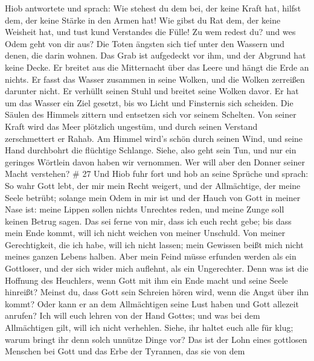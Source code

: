 Hiob antwortete und sprach:  Wie stehest du dem bei, der
keine Kraft hat, hilfst dem, der keine Stärke in den Armen hat!
 Wie gibst du Rat dem, der keine Weisheit hat, und tust kund
Verstandes die Fülle!  Zu wem redest du? und wes Odem geht
von dir aus?  Die Toten ängsten sich tief unter den Wassern
und denen, die darin wohnen.  Das Grab ist aufgedeckt vor
ihm, und der Abgrund hat keine Decke.  Er breitet aus die
Mitternacht über das Leere und hängt die Erde an nichts.  Er
fasst das Wasser zusammen in seine Wolken, und die Wolken zerreißen
darunter nicht.  Er verhüllt seinen Stuhl und breitet seine
Wolken davor.  Er hat um das Wasser ein Ziel gesetzt, bis
wo Licht und Finsternis sich scheiden.  Die Säulen des
Himmels zittern und entsetzen sich vor seinem Schelten. 
Von seiner Kraft wird das Meer plötzlich ungestüm, und durch seinen
Verstand zerschmettert er Rahab.  Am Himmel wird's schön
durch seinen Wind, und seine Hand durchbohrt die flüchtige Schlange.
 Siehe, also geht sein Tun, und nur ein geringes Wörtlein
davon haben wir vernommen. Wer will aber den Donner seiner Macht
verstehen? \# 27  Und Hiob fuhr fort und hob an seine
Sprüche und sprach:  So wahr Gott lebt, der mir mein Recht
weigert, und der Allmächtige, der meine Seele betrübt; 
solange mein Odem in mir ist und der Hauch von Gott in meiner Nase ist:
 meine Lippen sollen nichts Unrechtes reden, und meine Zunge
soll keinen Betrug sagen.  Das sei ferne von mir, dass ich
euch recht gebe; bis dass mein Ende kommt, will ich nicht weichen von
meiner Unschuld.  Von meiner Gerechtigkeit, die ich habe,
will ich nicht lassen; mein Gewissen beißt mich nicht meines ganzen
Lebens halben.  Aber mein Feind müsse erfunden werden als
ein Gottloser, und der sich wider mich auflehnt, als ein Ungerechter.
 Denn was ist die Hoffnung des Heuchlers, wenn Gott mit ihm
ein Ende macht und seine Seele hinreißt?  Meinst du, dass
Gott sein Schreien hören wird, wenn die Angst über ihn kommt?
 Oder kann er an dem Allmächtigen seine Lust haben und Gott
allezeit anrufen?  Ich will euch lehren von der Hand
Gottes; und was bei dem Allmächtigen gilt, will ich nicht verhehlen.
 Siehe, ihr haltet euch alle für klug; warum bringt ihr
denn solch unnütze Dinge vor?  Das ist der Lohn eines
gottlosen Menschen bei Gott und das Erbe der Tyrannen, das sie von dem
